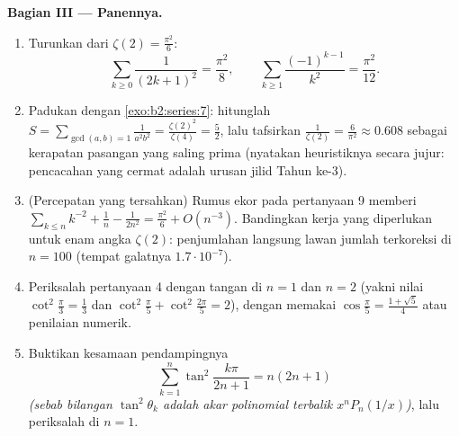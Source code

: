 \begin{problem}[{Soal akhir pekan --- $\zeta(2) = \pi^2/6$ dan
panorama Bertrand}]
\medskip
\noindent\textbf{Bagian III --- Panennya.}
\begin{enumerate}[resume]
  \item Turunkan dari $\zeta(2) = \frac{\pi^2}6$:
        \[
        \sum_{k\geq0}\frac{1}{(2k+1)^2} = \frac{\pi^2}{8},
        \qquad
        \sum_{k\geq1}\frac{(-1)^{k-1}}{k^2} = \frac{\pi^2}{12}.
        \]
  \item Padukan dengan \cref{exo:b2:series:7}: hitunglah $S =
        \sum_{\gcd(a,b)=1}\frac{1}{a^2b^2} =
        \frac{\zeta(2)^2}{\zeta(4)} = \frac52$, lalu tafsirkan
        $\frac{1}{\zeta(2)} = \frac{6}{\pi^2} \approx 0.608$ sebagai
        kerapatan pasangan yang saling prima (nyatakan heuristiknya
        secara jujur: pencacahan yang cermat adalah urusan jilid Tahun
        ke-3).
  \item (Percepatan yang tersahkan) Rumus ekor pada pertanyaan 9
        memberi $\sum_{k\leq n}k^{-2} + \frac1n - \frac1{2n^2} =
        \frac{\pi^2}6 + O(n^{-3})$. Bandingkan kerja yang diperlukan
        untuk enam angka $\zeta(2)$: penjumlahan langsung lawan
        jumlah terkoreksi di $n = 100$ (tempat galatnya
        $1.7\cdot10^{-7}$).
  \item Periksalah pertanyaan 4 dengan tangan di $n = 1$ dan $n = 2$
        (yakni nilai $\cot^2\frac\pi3 = \frac13$ dan
        $\cot^2\frac\pi5 + \cot^2\frac{2\pi}5 = 2$), dengan memakai
        $\cos\frac\pi5 = \frac{1+\sqrt5}4$ atau penilaian numerik.
  \item Buktikan kesamaan pendampingnya
        \[
        \sum_{k=1}^{n}\tan^2\frac{k\pi}{2n+1} = n(2n+1)
        \]
        \emph{(sebab bilangan $\tan^2\theta_k$ adalah akar
        polinomial terbalik $x^nP_n(1/x)$)}, lalu periksalah di $n
        = 1$.
\end{enumerate}


\end{problem}
